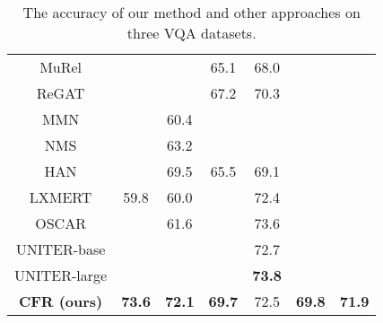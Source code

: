 \documentclass[10pt,twocolumn,letterpaper]{article}
\begin{document}
\begin{table}[!t]
\begin{center}
{\begin{tabular}{c|c|c|c|c|c|c}
MuRel \cite{cadene2019murel}       &                  &                     & 65.1                    & 68.0                       &                       &                       \\ 
ReGAT \cite{li2019regat}           &                  &                     & 67.2                    & 70.3                       &                       &                       \\  
MMN \cite{chen2021meta}            &                  & 60.4                     &                    &                       &                       &                       \\ 
NMS \cite{Hudson2019LearningBA}    &                  & 63.2                     &                    &                       &                       &                       \\ 
HAN \cite{kim2020hypergraph}       &                  & 69.5                     & 65.5                    & 69.1                       &                       &                       \\ \hline
LXMERT \cite{tan2019lxmert}        & 59.8                  & 60.0                     &                    & 72.4                       &                       &                       \\ 
OSCAR \cite{li2020oscar}           &                  & 61.6                     &                    & 73.6                       &                       &                       \\

UNITER-base \cite{chen2020uniter}           &                  &                     &                    & 72.7                      &                       &    \\

UNITER-large \cite{chen2020uniter}           &                  &                     &                    & \textbf{73.8}                      &                       &                       \\ \hline
\textbf{CFR (ours)}                                 & \textbf{73.6}         & \textbf{72.1}            & \textbf{69.7}           & 72.5              & \textbf{69.8}              & \textbf{71.9}              \\
\hline
\end{tabular}
}
\end{center}
\caption{The accuracy of our method and other approaches on three VQA datasets.
}
\label{tab:sota}
\end{table}
\end{document}
